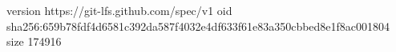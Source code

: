 version https://git-lfs.github.com/spec/v1
oid sha256:659b78fdf4d6581c392da587f4032e4df633f61e83a350cbbed8e1f8ac001804
size 174916
